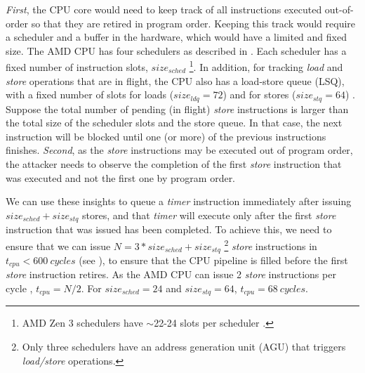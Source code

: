 \textit{First}, the CPU core would need to keep track of all instructions executed out-of-order so that they are retired in program order.
Keeping this track would require a scheduler and a buffer in the hardware, which would have a limited and fixed size.
The AMD CPU has four schedulers as described in . Each scheduler has a fixed number of instruction slots, $size_{sched}$
\footnote{AMD Zen 3 schedulers have $\sim$22-24 slots per scheduler \cite{gast2023squip}.}.
In addition, for tracking \textit{load} and \textit{store} operations that are in flight, the CPU also has a load-store queue (LSQ), with a fixed number of slots for loads ($size_{ldq} = 72$) and for stores ($size_{stq} = 64$) \cite{amd_7003_software_optimization_guide}.
Suppose the total number of pending (in flight) \textit{store} instructions is larger than the total size of the scheduler slots and the store queue. 
In that case, the next instruction will be blocked until one (or more) of the previous instructions finishes.
\textit{Second}, as the \textit{store} instructions may be executed out of program order, the attacker needs to observe the completion of the first \textit{store} instruction that was executed and not the first one by program order.

We can use these insights to queue a \textit{timer} instruction immediately after issuing $size_{sched} + size_{stq}$ stores, and that \textit{timer} will execute only after the first \textit{store} instruction that was issued has been completed.
To achieve this, we need to ensure that we can issue $N = 3 * size_{sched} + size_{stq}$ 
\footnote{Only three schedulers have an address generation unit (AGU) that triggers \textit{load/store} operations.}
\textit{store} instructions in $t_{cpu} < 600~cycles$ (see ), to ensure that the CPU pipeline is filled before the first \textit{store} instruction retires.
As the AMD CPU can issue 2 \textit{store} instructions per cycle \cite{amd_7003_software_optimization_guide}, $t_{cpu} = N/2$.
For $size_{sched} = 24$ and $size_{stq} = 64$, $t_{cpu} = 68~cycles$.

